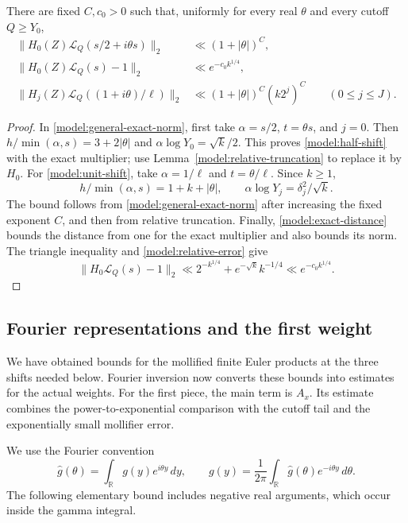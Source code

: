 \begin{proposition}\label{model:shifted-norms}
There are fixed $C,c_0>0$ such that, uniformly for every real $\theta$
and every cutoff $Q\ge Y_0$,
\begin{align}
 \|H_0(Z)\mathcal L_Q(s/2+i\theta s)\|_2
       &\ll(1+|\theta|)^C,
 \label{model:half-shift}\\
 \|H_0(Z)\mathcal L_Q(s)-1\|_2
       &\ll e^{-c_0 k^{1/4}},
 \label{model:mollified-distance}\\
 \|H_j(Z)\mathcal L_Q((1+i\theta)/\ell)\|_2
       &\ll (1+|\theta|)^C(k2^j)^C
          \qquad(0\le j\le J).
 \label{model:unit-shift}
\end{align}
\end{proposition}

\begin{proof}
In \eqref{model:general-exact-norm}, first take
$\alpha=s/2$, $t=\theta s$, and $j=0$.
Then $h/\min(\alpha,s)=3+2|\theta|$ and
$\alpha\log Y_0=\sqrt k/2$.  This proves
\eqref{model:half-shift} with the exact multiplier; use
Lemma~\ref{model:relative-truncation} to replace it by $H_0$.
For \eqref{model:unit-shift}, take $\alpha=1/\ell$ and
$t=\theta/\ell$.  Since $k\ge1$,
\[
 h/\min(\alpha,s)=1+k+|\theta|,
 \qquad \alpha\log Y_j=\delta_j^2/\sqrt k.
\]
The bound follows from \eqref{model:general-exact-norm} after increasing
the fixed exponent $C$, and then from relative truncation.
Finally, \eqref{model:exact-distance} bounds the distance from one for
the exact multiplier and also bounds its norm.  The triangle inequality
and \eqref{model:relative-error} give
\[
 \|H_0\mathcal L_Q(s)-1\|_2
 \ll 2^{-k^{1/4}}+e^{-\sqrt k}k^{-1/4}
 \ll e^{-c_0k^{1/4}}.
\]
\end{proof}

\subsection{Fourier representations and the first weight}

We have obtained bounds for the mollified finite Euler products at the
three shifts needed below. Fourier inversion now converts these bounds
into estimates for the actual weights. For the first piece, the main
term is $A_x$. Its estimate combines the power-to-exponential comparison
with the cutoff tail and the exponentially small mollifier error.

We use the Fourier convention
\[
 \widehat g(\theta)=\int_{\mathbb R}g(y)e^{i\theta y}\,dy,
 \qquad
 g(y)=\frac1{2\pi}\int_{\mathbb R}\widehat g(\theta)e^{-i\theta y}
 \,d\theta.
\]
The following elementary bound includes negative real arguments, which
occur inside the gamma integral.

